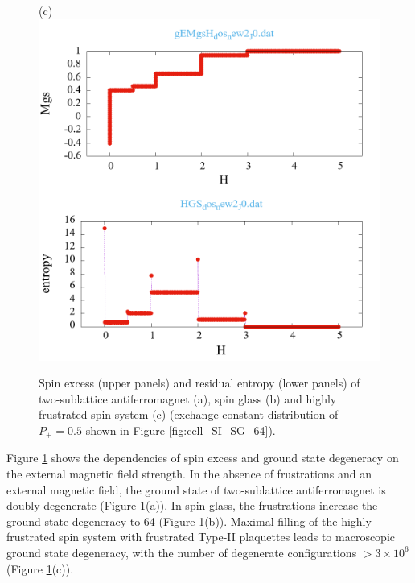 \documentclass[preprint,12pt]{elsarticle}
\begin{document}
\begin{figure}[H]
\begin{minipage}[h]{0.32\linewidth}
		\end{minipage}
		\hfill
		\begin{minipage}[h]{0.32\linewidth}
			\centering
			\hspace{1cm}(c)
			\includegraphics[width=1\linewidth]{pictures/_multiplot_SI64_J0}
		\end{minipage}
		
		\caption{Spin excess (upper panels) and residual entropy (lower panels) of two-sublattice antiferromagnet (a), spin glass (b) and highly frustrated spin system (c) (exchange constant distribution of $P_+ = 0.5$ shown in Figure \ref{fig:cell_SI_SG_64}).}
		\label{fig:_multiplot_SI_SG_64}
		
	\end{figure}

	Figure \ref{fig:_multiplot_SI_SG_64} shows the dependencies of spin excess and ground state degeneracy on the external magnetic field strength.
	In the absence of frustrations and an external magnetic field, the ground state of two-sublattice antiferromagnet is doubly degenerate (Figure \ref{fig:_multiplot_SI_SG_64}(a)).
	In spin glass, the frustrations increase the ground state degeneracy to 64 (Figure \ref{fig:_multiplot_SI_SG_64}(b)).
	Maximal filling of the highly frustrated spin system with frustrated Type-II plaquettes leads to macroscopic ground state degeneracy, with the number of degenerate configurations $> 3\times10^{6}$ (Figure \ref{fig:_multiplot_SI_SG_64}(c)).
	
\end{document}
